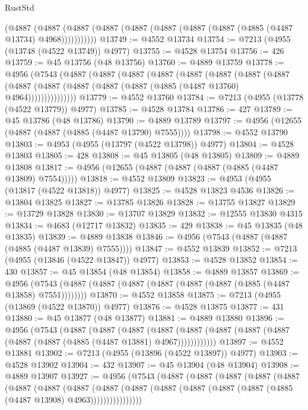 \begin{lexlean}{RustStd}
\begin{coremodule}
        (@4887
          (@4887 (@4887 (@4887 (@4887 (@4887 (@4887 (@4887 (@4885 (@4487 @13734) @4968)))))))))))
@13749 := @4552 @13734
@13754 := @7213 (@4955 (@13748 (@4522 @13749)) @4977)
@13755 := @4528 @13754
@13756 := 426
@13759 := @45 @13756 (@48 @13756)
@13760 := @4889 @13759
@13778 := @4956
    (@7543
      (@4887
        (@4887
          (@4887
            (@4887
              (@4887
                (@4887
                  (@4887
                    (@4887
                      (@4887 (@4887 (@4887 (@4887 (@4887 (@4885 (@4487 @13760) @4964)))))))))))))))
@13779 := @4552 @13760
@13784 := @7213 (@4955 (@13778 (@4522 @13779)) @4977)
@13785 := @4528 @13784
@13786 := 427
@13789 := @45 @13786 (@48 @13786)
@13790 := @4889 @13789
@13797 := @4956 (@12655 (@4887 (@4887 (@4885 (@4487 @13790) @7555))))
@13798 := @4552 @13790
@13803 := @4953 (@4955 (@13797 (@4522 @13798)) @4977)
@13804 := @4528 @13803
@13805 := 428
@13808 := @45 @13805 (@48 @13805)
@13809 := @4889 @13808
@13817 := @4956 (@12655 (@4887 (@4887 (@4887 (@4885 (@4487 @13809) @7554)))))
@13818 := @4552 @13809
@13823 := @4953 (@4955 (@13817 (@4522 @13818)) @4977)
@13825 := @4528 @13823 @4536
@13826 := @13804 @13825
@13827 := @13785 @13826
@13828 := @13755 @13827
@13829 := @13729 @13828
@13830 := @13707 @13829
@13832 := @12555 @13830 @4315
@13834 := @4683 (@12717 @13832)
@13835 := 429
@13838 := @45 @13835 (@48 @13835)
@13839 := @4889 @13838
@13846 := @4956 (@7543 (@4887 (@4887 (@4885 (@4487 @13839) @7555))))
@13847 := @4552 @13839
@13852 := @7213 (@4955 (@13846 (@4522 @13847)) @4977)
@13853 := @4528 @13852
@13854 := 430
@13857 := @45 @13854 (@48 @13854)
@13858 := @4889 @13857
@13869 := @4956 (@7543 (@4887 (@4887 (@4887 (@4887 (@4887 (@4887 (@4885 (@4487 @13858) @7551))))))))
@13870 := @4552 @13858
@13875 := @7213 (@4955 (@13869 (@4522 @13870)) @4977)
@13876 := @4528 @13875
@13877 := 431
@13880 := @45 @13877 (@48 @13877)
@13881 := @4889 @13880
@13896 := @4956
    (@7543
      (@4887
        (@4887
          (@4887
            (@4887 (@4887 (@4887 (@4887 (@4887 (@4887 (@4887 (@4885 (@4487 @13881) @4967))))))))))))
@13897 := @4552 @13881
@13902 := @7213 (@4955 (@13896 (@4522 @13897)) @4977)
@13903 := @4528 @13902
@13904 := 432
@13907 := @45 @13904 (@48 @13904)
@13908 := @4889 @13907
@13927 := @4956
    (@7543
      (@4887
        (@4887
          (@4887
            (@4887
              (@4887
                (@4887
                  (@4887
                    (@4887
                      (@4887
                        (@4887
                          (@4887 (@4887 (@4887 (@4887 (@4885 (@4487 @13908) @4963))))))))))))))))

\end{coremodule}
\end{lexlean}
